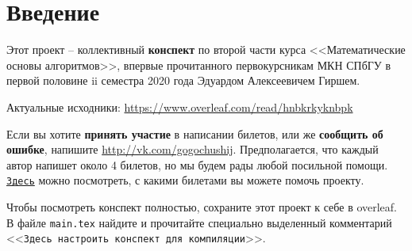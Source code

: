 \section*{Введение}

Этот проект -- коллективный \textbf{конспект} по второй части курса <<Математические основы алгоритмов>>, впервые прочитанного первокурсникам МКН СПбГУ в первой половине ii семестра 2020 года Эдуардом Алексеевичем Гиршем. 

Актуальные исходники: \url{https://www.overleaf.com/read/hnbkrkyknbpk}

Если вы хотите \textbf{принять участие} в написании билетов, или же 
\textbf{сообщить об ошибке}, напишите \url{http://vk.com/gogochushij}. Предполагается, что каждый автор напишет около 4 билетов, но мы будем рады любой посильной помощи. \href{https://docs.google.com/spreadsheets/d/17MKhLVzCyYvEKlm6W5Bb-6uUDNyv0QLmdvuh4N6JfXI/edit?usp=sharing}{\texttt{Здесь}} можно посмотреть, с какими билетами вы можете помочь проекту.

Чтобы посмотреть конспект полностью, сохраните этот проект к себе в overleaf. В файле \texttt{main.tex} найдите и прочитайте специально выделенный комментарий <<\texttt{Здесь настроить конспект для компиляции}>>.
